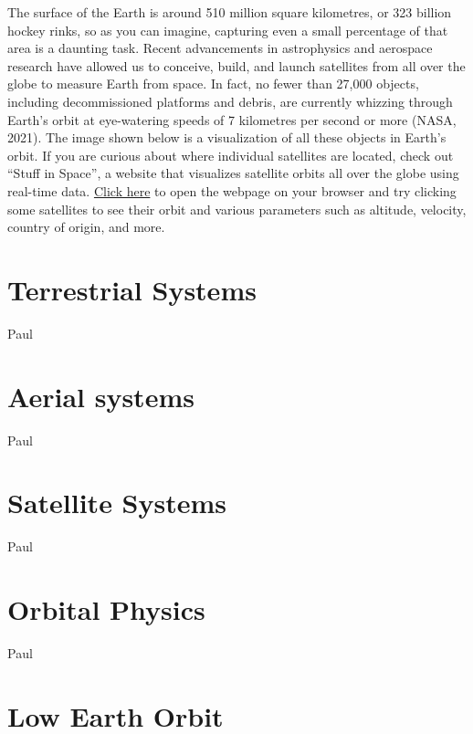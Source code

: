 \documentclass[
]{book}
\begin{document}
The surface of the Earth is around 510 million square kilometres, or 323 billion hockey rinks, so as you can imagine, capturing even a small percentage of that area is a daunting task. Recent advancements in astrophysics and aerospace research have allowed us to conceive, build, and launch satellites from all over the globe to measure Earth from space. In fact, no fewer than 27,000 objects, including decommissioned platforms and debris, are currently whizzing through Earth's orbit at eye-watering speeds of 7 kilometres per second or more (NASA, 2021). The image shown below is a visualization of all these objects in Earth's orbit. If you are curious about where individual satellites are located, check out ``Stuff in Space'', a website that visualizes satellite orbits all over the globe using real-time data. \href{http://www.stuffin.space/}{Click here} to open the webpage on your browser and try clicking some satellites to see their orbit and various parameters such as altitude, velocity, country of origin, and more.

\hypertarget{terrestrial-systems}{%
\section{Terrestrial Systems}\label{terrestrial-systems}}

Paul

\hypertarget{aerial-systems}{%
\section{Aerial systems}\label{aerial-systems}}

Paul

\hypertarget{satellite-systems}{%
\section{Satellite Systems}\label{satellite-systems}}

Paul

\hypertarget{orbital-physics}{%
\section{Orbital Physics}\label{orbital-physics}}

Paul

\hypertarget{low-earth-orbit}{%
\section{Low Earth Orbit}\label{low-earth-orbit}}
\end{document}
